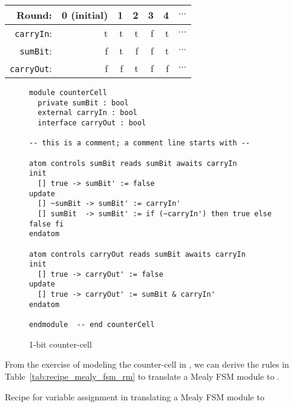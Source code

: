 \begin{center}
\begin{tabular}{r|rrrrrc}
Round: 
 & 0 (initial) & 1 & 2 & 3 & 4 & $\cdots$ \\ \hline
{\tt carryIn}:  & {\sc t} & {\sc t} & {\sc t} & {\sc f} & {\sc t} & $\cdots$ \\
{\tt sumBit}:  & {\sc f} & {\sc t} & {\sc f} & {\sc f} & {\sc t} & $\cdots$ \\
{\tt carryOut}:   & {\sc f} & {\sc f} & {\sc t} & {\sc f} & {\sc f} & $\cdots$ \\ \hline
\end{tabular}
\end{center}



\begin{figure}
\begin{verbatim}
module counterCell
  private sumBit : bool
  external carryIn : bool
  interface carryOut : bool

-- this is a comment; a comment line starts with --

atom controls sumBit reads sumBit awaits carryIn 
init
  [] true -> sumBit' := false
update
  [] ~sumBit -> sumBit' := carryIn'
  [] sumBit  -> sumBit' := if (~carryIn') then true else false fi
endatom

atom controls carryOut reads sumBit awaits carryIn
init
  [] true -> carryOut' := false
update
  [] true -> carryOut' := sumBit & carryIn'
endatom

endmodule  -- end counterCell

\end{verbatim}
\caption{1-bit counter-cell}
\label{fig:counter_cell_rm}
\end{figure}


From the exercise of modeling the counter-cell in \rem, we can derive
the rules in Table~\ref{tab:recipe_mealy_fsm_rm} to translate a
Mealy FSM module to \rem. 

\begin{table}
\caption{Recipe for variable assignment in translating a Mealy FSM
module to \rem}
\label{tab:recipe_mealy_fsm_rm}
\end{table}
